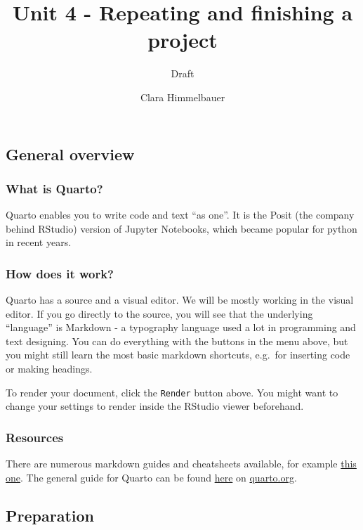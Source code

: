 \documentclass[
  letterpaper,
  DIV=11,
  numbers=noendperiod]{scrartcl}
\title{Unit 4 - Repeating and finishing a project}
\subtitle{Draft}
\author{Clara Himmelbauer}
\date{}
\begin{document}
\maketitle


\subsection{General overview}\label{general-overview}

\subsubsection{What is Quarto?}\label{what-is-quarto}

Quarto enables you to write code and text ``as one''. It is the Posit
(the company behind RStudio) version of Jupyter Notebooks, which became
popular for python in recent years.

\subsubsection{How does it work?}\label{how-does-it-work}

Quarto has a source and a visual editor. We will be mostly working in
the visual editor. If you go directly to the source, you will see that
the underlying ``language'' is Markdown - a typography language used a
lot in programming and text designing. You can do everything with the
buttons in the menu above, but you might still learn the most basic
markdown shortcuts, e.g.~for inserting code or making headings.

To render your document, click the \texttt{Render} button above. You
might want to change your settings to render inside the RStudio viewer
beforehand.

\subsubsection{Resources}\label{resources}

There are numerous markdown guides and cheatsheets available, for
example
\href{https://www.datacamp.com/cheat-sheet/markdown-cheat-sheet-23}{this
one}. The general guide for Quarto can be found
\href{https://quarto.org/docs/guide/}{here} on
\href{https://quarto.org/}{quarto.org}.

\subsection{Preparation}\label{preparation}
\end{document}
